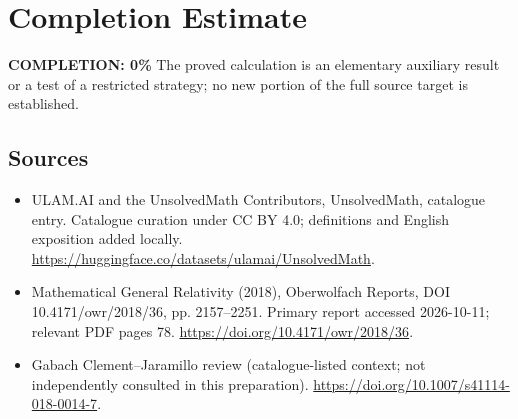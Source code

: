 \documentclass[11pt]{article}
\begin{document}
\section{Completion Estimate}
\noindent\textbf{COMPLETION: 0\%}
The proved calculation is an elementary auxiliary result or a test of a restricted strategy; no new portion of the full source target is established.

\subsection{Sources}
\begin{itemize}
\item[\hypertarget{source:statement:1}{S1}] ULAM.AI and the UnsolvedMath Contributors, UnsolvedMath, catalogue entry. Catalogue curation under CC BY 4.0; definitions and English exposition added locally.
\url{https://huggingface.co/datasets/ulamai/UnsolvedMath}.
\item[\hypertarget{source:statement:2}{S2}] Mathematical General Relativity (2018), Oberwolfach Reports, DOI 10.4171/owr/2018/36, pp. 2157--2251. Primary report accessed 2026-10-11; relevant PDF pages 78.
\url{https://doi.org/10.4171/owr/2018/36}.
\item[\hypertarget{source:statement:3}{S3}] Gabach Clement--Jaramillo review (catalogue-listed context; not independently consulted in this preparation).
\url{https://doi.org/10.1007/s41114-018-0014-7}.
\end{itemize}
\label{end:statement}
\end{document}
